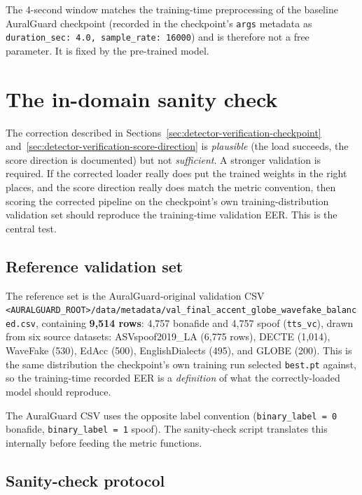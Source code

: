 The 4-second window matches the training-time preprocessing of the
baseline AuralGuard checkpoint (recorded in the checkpoint's
\texttt{args} metadata as \texttt{duration\_sec: 4.0,
sample\_rate: 16000}) and is therefore not a free parameter. It is
fixed by the pre-trained model.


\section{The in-domain sanity check}
\label{sec:detector-verification-indomain}

The correction described in
Sections~\ref{sec:detector-verification-checkpoint}
and~\ref{sec:detector-verification-score-direction} is
\emph{plausible} (the load succeeds, the score direction is
documented) but not \emph{sufficient}. A stronger validation is
required. If the corrected loader really does put the trained
weights in the right places, and the score direction really does
match the metric convention, then scoring the corrected pipeline on
the checkpoint's own training-distribution validation set should
reproduce the training-time validation EER. This is the central
test.

\subsection{Reference validation set}
\label{sec:detector-verification-indomain-refset}

The reference set is the AuralGuard-original validation CSV
\texttt{<AURALGUARD\_ROOT>/}\allowbreak\texttt{data/}\allowbreak\texttt{metadata/}\allowbreak\texttt{val\_final\_accent\_globe\_}\allowbreak\texttt{wavefake\_balanced.csv},
containing \textbf{9,514 rows}: 4,757 bonafide and 4,757
spoof (\texttt{tts\_vc}), drawn from six source datasets: ASVspoof2019\_LA
(6,775 rows), DECTE (1,014), WaveFake (530), EdAcc (500),
EnglishDialects (495), and GLOBE (200). This is the same
distribution the checkpoint's own training run selected \texttt{best.pt}
against, so the training-time recorded EER is a \emph{definition} of
what the correctly-loaded model should reproduce.

The AuralGuard CSV uses the opposite label convention
(\texttt{binary\_label = 0} bonafide, \texttt{binary\_label = 1}
spoof). The sanity-check script translates this internally before
feeding the metric functions.

\subsection{Sanity-check protocol}
\label{sec:detector-verification-indomain-protocol}

